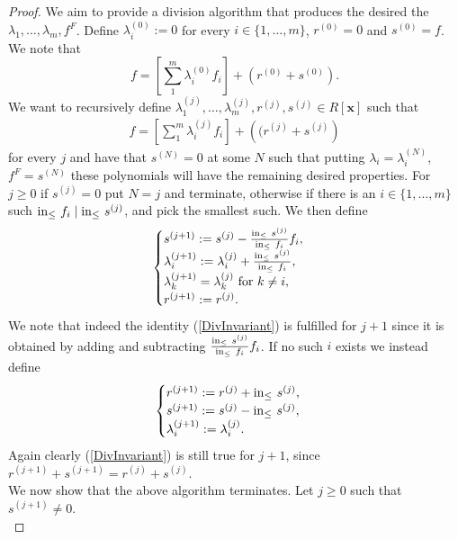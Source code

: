 \begin{proof}
    We aim to provide a division algorithm that produces the desired the $\lambda_1,\dots,\lambda_m,f^F$. Define $\lambda_i^{(0)} := 0$ for every $i\in\{1,\dots,m\}$, $r^{(0)}=0$ and $s^{(0)} = f$. We note that 
    $$f = \left[\sum_1^m\lambda_i^{(0)}f_i\right] +\left(r^{(0)}+s^{(0)}\right).$$
    We want to recursively define $\lambda_1^{(j)},\dots,\lambda_m^{(j)},r^{(j)},s^{(j)}\in R[\mathbf{x}]$ such that 
    \begin{gather}\label{DivInvariant} 
        f = \left[\sum_1^m \lambda_i^{(j)}f_i\right] + \left((r^{(j)}+s^{(j)}\right)
    \end{gather}
    for every $j$ and have that $s^{(N)}=0$ at some $N$ such that putting $\lambda_i = \lambda_i^{(N)}$, $f^F=s^{(N)}$ these polynomials will have the remaining desired properties. For $j\geq 0$ if $s^{(j)}=0$ put $N=j$ and terminate, otherwise if there is an $i\in\{1,\dots,m\}$ such $\mathrm{in}_\leq\ f_i\mid \mathrm{in}_\leq\ s^{(j)}$, and pick the smallest such. We then define 
    \begin{equation}\label{reduction}
        \begin{cases}
            s^{(j+1)} := s^{(j)}-\frac{\inn\ s^{(j)}}{\inn\ f_i}f_i,\\
            \lambda_i^{(j+1)}:= \lambda_i^{(j)}+ \frac{\inn\ s^{(j)}}{\inn\ f_i},\\
            \lambda_k^{(j+1)} = \lambda_k^{(j)} \text{ for } k\neq i,\\
            r^{(j+1)}:= r^{(j)}.
        \end{cases}
    \end{equation}
    We note that indeed the identity (\ref{DivInvariant}) is fulfilled for $j+1$ since it is obtained by adding and subtracting $\frac{\mathrm{in}_\leq\ s^{(j)}}{\mathrm{in}_\leq\ f_i}f_i$.
    If no such $i$ exists we instead define 
    \begin{equation}\label{residue}
        \begin{cases}
            r^{(j+1)} := r^{(j)}+\mathrm{in}_\leq\ s^{(j)},\\
            s^{(j+1)} := s^{(j)}-\mathrm{in}_\leq\ s^{(j)},\\
            \lambda_i^{(j+1)} := \lambda_i^{(j)}.
        \end{cases}
    \end{equation}
    Again clearly (\ref{DivInvariant}) is still true for $j+1$, since $r^{(j+1)}+ s^{(j+1)} = r^{(j)}+s^{(j)}$.\\
    We now show that the above algorithm terminates. Let $j\geq 0$ such that $s^{(j+1)}\neq 0$.\\ 

\end{proof}
